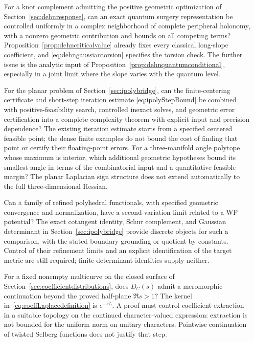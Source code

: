 \begin{question}
For a knot complement admitting the positive geometric optimization
of Section~\ref{sec:dehnresponse}, can an exact quantum surgery
representation be controlled uniformly in a complex neighborhood
of complete peripheral holonomy, with a nonzero geometric contribution
and bounds on all competing terms? Proposition~\ref{prop:dehncriticalvalue}
already fixes every classical long-slope coefficient, and
\eqref{eq:dehngaussiantorsion} specifies the torsion check. The further
issue is the analytic input of
Proposition~\ref{prop:dehnquantumconditional}, especially in a joint
limit where the slope varies with the quantum level.
\end{question}


\begin{question}
For the planar problem of Section~\ref{sec:ipolybridge}, can the
finite-centering certificate and short-step iteration estimate
\eqref{eq:ipolyStepBound} be combined with positive-feasibility search,
controlled inexact solves, and geometric error certification into a
complete complexity theorem with explicit input and precision dependence?
The existing iteration estimate starts from a specified centered
feasible point; the dense finite examples do not bound the cost of
finding that point or certify their floating-point errors.
For a three-manifold angle
polytope whose maximum is interior, which additional geometric hypotheses
bound its smallest angle in terms of the combinatorial input and a
quantitative feasible margin? The planar Laplacian sign structure does
not extend automatically to the full three-dimensional Hessian.
\end{question}

\begin{question}
Can a family of refined polyhedral functionals, with specified geometric
convergence and normalization, have a second-variation limit related to
a WP potential? The exact cotangent identity, Schur complement, and
Gaussian determinant in Section~\ref{sec:ipolybridge} provide discrete
objects for such a comparison, with the stated boundary grounding or
quotient by constants. Control of their refinement limits and an
explicit identification of the target metric are still required;
finite determinant identities supply neither.
\end{question}

\begin{question}
For a fixed nonempty multicurve on the closed surface of
Section~\ref{sec:coefficientdistributions}, does $D_C(s)$ admit a
meromorphic continuation beyond the proved half-plane $\Re s>1$?
The kernel in~\eqref{eq:coeffLaplacedefinition} is $e^{-sL}$.
A proof must control coefficient extraction in a suitable topology
on the continued character-valued expression: extraction is not
bounded for the uniform norm on unitary characters. Pointwise
continuation of twisted Selberg functions does not justify that step.
\end{question}

